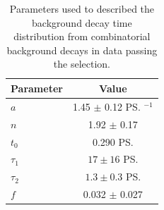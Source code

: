 \begin{table}[htbp]
\begin{center}
\begin{tabular}{lc}
\hline
Parameter & Value \\
\hline
$a$ & 1.45 $\pm$ 0.12 \ps$^{-1}$\\
$n$ & 1.92 $\pm$ 0.17 \\
$t_{0}$ & 0.290 \ps \\
$\tau_{1}$ & $17 \pm 16$ \ps \\ 
$\tau_{2}$ & $1.3 \pm 0.3$ \ps \\
$f$ & 0.032 $\pm$ 0.027 \\
\hline
\end{tabular}
\vspace{0.7cm}             
\caption{Parameters used to described the background decay time distribution from combinatorial background decays in data passing the \bhh selection.}
\label{tab:bkgparams}
\end{center}
\vspace{-1.0cm}                                                                                                                                               
\end{table}

